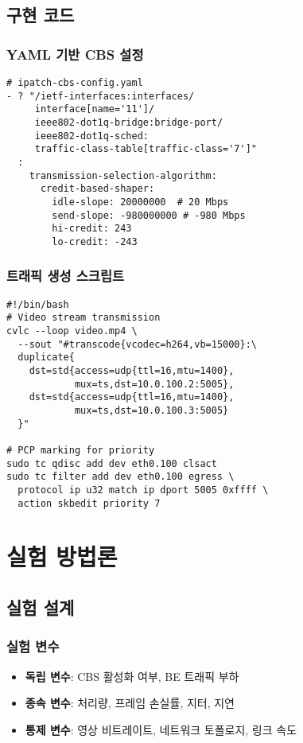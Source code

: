 \documentclass[10pt,twocolumn]{IEEEtran}
\begin{document}
\subsection{구현 코드}

\subsubsection{YAML 기반 CBS 설정}
\begin{verbatim}
# ipatch-cbs-config.yaml
- ? "/ietf-interfaces:interfaces/
     interface[name='11']/
     ieee802-dot1q-bridge:bridge-port/
     ieee802-dot1q-sched:
     traffic-class-table[traffic-class='7']"
  : 
    transmission-selection-algorithm:
      credit-based-shaper:
        idle-slope: 20000000  # 20 Mbps
        send-slope: -980000000 # -980 Mbps
        hi-credit: 243
        lo-credit: -243
\end{verbatim}

\subsubsection{트래픽 생성 스크립트}
\begin{verbatim}
#!/bin/bash
# Video stream transmission
cvlc --loop video.mp4 \
  --sout "#transcode{vcodec=h264,vb=15000}:\
  duplicate{
    dst=std{access=udp{ttl=16,mtu=1400},
            mux=ts,dst=10.0.100.2:5005},
    dst=std{access=udp{ttl=16,mtu=1400},
            mux=ts,dst=10.0.100.3:5005}
  }"

# PCP marking for priority
sudo tc qdisc add dev eth0.100 clsact
sudo tc filter add dev eth0.100 egress \
  protocol ip u32 match ip dport 5005 0xffff \
  action skbedit priority 7
\end{verbatim}

\section{실험 방법론}

\subsection{실험 설계}

\subsubsection{실험 변수}
\begin{itemize}
\item \textbf{독립 변수}: CBS 활성화 여부, BE 트래픽 부하
\item \textbf{종속 변수}: 처리량, 프레임 손실률, 지터, 지연
\item \textbf{통제 변수}: 영상 비트레이트, 네트워크 토폴로지, 링크 속도
\end{itemize}
\end{document}
